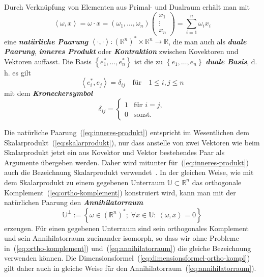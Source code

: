 \documentclass[a4paper,twoside,english,ngerman,deutsch,german,sectrefs,envcountsame,envcountchap]{svmono}
\begin{document}
Durch Verknüpfung von Elementen aus Primal- und Dualraum erhält man mit
\begin{equation}
\left\langle \omega,x\right\rangle =\omega\cdot x=\left(\omega_{1},\ldots,\omega_{n}\right)\left(\begin{array}{c}
x_{1}\\
\vdots\\
x_{n}
\end{array}\right)=\sum_{i=1}^{n}\omega_{i}x_{i}\label{eq:inneres-produkt}
\end{equation}
eine \textbf{\em natürliche Paarung}  $\left\langle \cdot,\cdot\right\rangle :({\mathbb{R}}^{n})^{*}\times{\mathbb{R}}^{n}\to{\mathbb{R}}$, die man auch als \textbf{\em duale Paarung}, \textbf{\em inneres Produkt} oder \textbf{\em Kontraktion} zwischen Kovektoren und Vektoren auffasst. Die Basis $\left\{ e_{1}^{*},\ldots,e_{n}^{*}\right\} $ ist die zu $\left\{ e_{1},\ldots,e_{n}\right\} $ \textbf{\em duale Basis}, d.\,h. es gilt
\[
\left\langle e_{i}^{*},e_{j}\right\rangle =\delta_{ij}\quad\textrm{für}\quad1\leq i,j\leq n
\]
mit dem \textbf{\em Kroneckersymbol}
\[
\delta_{ij}=\left\{ \begin{array}{cl}
1 & \textrm{für }i=j,\\ 0 & \textrm{sonst.}
\end{array}\right.
\]

Die natürliche Paarung~(\ref{eq:inneres-produkt}) entspricht im Wesentlichen dem Skalarprodukt~(\ref{eq:skalarprodukt}), nur dass anstelle von zwei Vektoren wie beim Skalarprodukt jetzt ein aus Kovektor und Vektor bestehendes Paar als Argumente übergeben werden. Daher wird mitunter für~(\ref{eq:inneres-produkt}) auch die Bezeichnung Skalarprodukt verwendet~\cite{bishop1980}. In der gleichen Weise, wie mit dem Skalarprodukt zu einem gegebenen Unterraum $\mathbb{U}\subset{\mathbb{R}}^{n}$ das orthogonale Komplement~(\ref{eq:ortho-komplement}) konstruiert wird, kann man mit der natürlichen Paarung den \textbf{\em Annihilatorraum}
\begin{equation}
\mathbb{U}^{\perp}:=\left\{ \omega\in({\mathbb{R}}^{n})^{*};\;\forall x\in\mathbb{U}:\,\left\langle \omega,x\right\rangle =0\right\} \label{eq:annihilatorraum}
\end{equation}
erzeugen. Für einen gegebenen Unterraum sind sein orthogonales Komplement und sein Annihilatorraum zueinander isomorph, so dass wir ohne Probleme in~(\ref{eq:ortho-komplement}) und~(\ref{eq:annihilatorraum}) die gleiche Bezeichnung verwenden können. Die Dimensionsformel~(\ref{eq:dimensionsformel-ortho-kompl}) gilt daher auch in gleiche Weise für den Annihilatorraum~(\ref{eq:annihilatorraum}).
\end{document}

